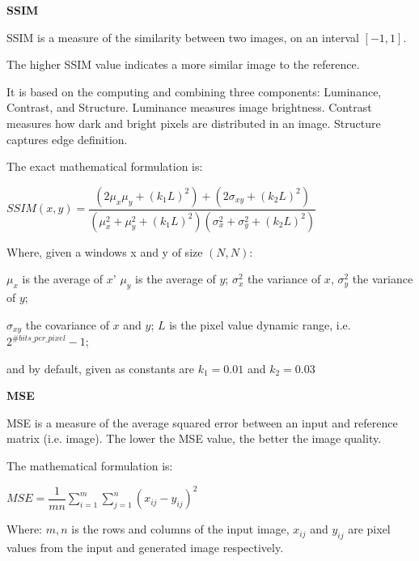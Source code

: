 \vspace{3mm}

\textbf{SSIM}


SSIM is a measure of the similarity between two images, on an interval $[-1, 1]$.

The higher SSIM value indicates a more similar image to the reference. 

It is based on the computing and combining three components: Luminance, Contrast, and Structure.
Luminance measures image brightness. Contrast measures how dark and bright pixels are distributed in an image. 
Structure captures edge definition. \citep{SSIM_bovik}
\vspace{2mm}

The exact mathematical formulation is:

\vspace{3mm}
\begin{center}
$SSIM(x,y) = \dfrac{(2\mu_x\mu_y + (k_1 L)^2) + (2 \sigma _{xy} + (k_2 L)^2)}{(\mu_x^2 + \mu_y^2+(k_1 L)^2) (\sigma_x^2 + \sigma_y^2+(k_2 L)^2)}$
\end{center}
\vspace{3mm}

Where, given a windows x and y of size $(N,N)$:

$\mu_x$ is the average of $x$'  $\mu_y$ is the average of $y$;  $\sigma _{x}^{2}$ the variance of $x$, $\sigma _{y}^{2}$ the variance of $y$;

$\sigma_{xy}$ the covariance of $x$ and $y$; $L$ is the pixel value dynamic range, i.e. $2^{\#bits\_per\_pixel}-1$;

and by default, given as constants are $k_{1}=0.01$ and $k_{2}=0.03$ \citep{SSIM_bovik}

\vspace{6mm}

\textbf{MSE}


MSE is a measure of the average squared error between an input and reference matrix (i.e. image). 
The lower the MSE value, the better the image quality.

The mathematical formulation is:

\vspace{3mm}

\begin{center}
$MSE=\dfrac{1}{mn} \sum_{i=1}^m \sum_{j=1}^n (x_{ij}-y_{ij})^2 $
\end{center}


Where:
$m,n$ is the rows and columns of the input image,
$x_{ij}$ and $y_{ij}$ are pixel values from the input and generated image respectively. \citep{Metrics}


